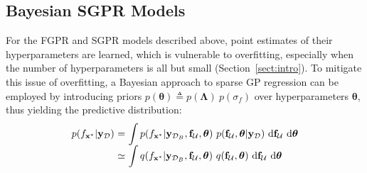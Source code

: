 \documentclass[conference]{IEEEtran}
\begin{document}
	\subsection{Bayesian SGPR Models}	
	\label{Bayesian SGP}\vspace{1mm}
	For the FGPR and SGPR models described above, %
	point estimates of their hyperparameters are learned, which is vulnerable to overfitting, especially when the number of hyperparameters is all but small (Section~\ref{sect:intro}). %
	To mitigate this issue of overfitting, a Bayesian approach to sparse GP regression can be employed by introducing priors $p(\boldsymbol{\theta}) \triangleq p(\mathbf{\Lambda})\ p(\sigma_f)$ over  hyperparameters $\boldsymbol{\theta}$,	
thus yielding the predictive distribution:\vspace{-0.3mm}
	\begin{equation}
		\hspace{0mm}
		\begin{array}{rcl}
			p(f_{\mathbf{x}^*}|\mathbf{y}_\mathcal{D}) &\hspace{-2.4mm}=&\hspace{-2.4mm} \displaystyle\int\hspace{-0mm} p(f_{\mathbf{x}^*}|\mathbf{y}_{\mathcal{D}_B},\mathbf{f}_\mathcal{U},\boldsymbol{\theta})\   p(\mathbf{f}_\mathcal{U},\boldsymbol{\theta}|\mathbf{y}_\mathcal{D}) \ \mathrm{d}\mathbf{f}_\mathcal{U}\ \mathrm{d}\boldsymbol{\theta} \\
			&\hspace{-2.4mm}\simeq&\hspace{-2.4mm}\displaystyle\int\hspace{-0mm} q(f_{\mathbf{x}^*}|\mathbf{y}_{\mathcal{D}_B},\mathbf{f}_\mathcal{U},\boldsymbol{\theta})\ q(\mathbf{f}_\mathcal{U},\boldsymbol{\theta})\ \mathrm{d}\mathbf{f}_\mathcal{U}\ \mathrm{d}\boldsymbol{\theta} \vspace{-5.5mm}
		\end{array}
		\label{E7}\vspace{3mm}
	\end{equation}
\end{document}

